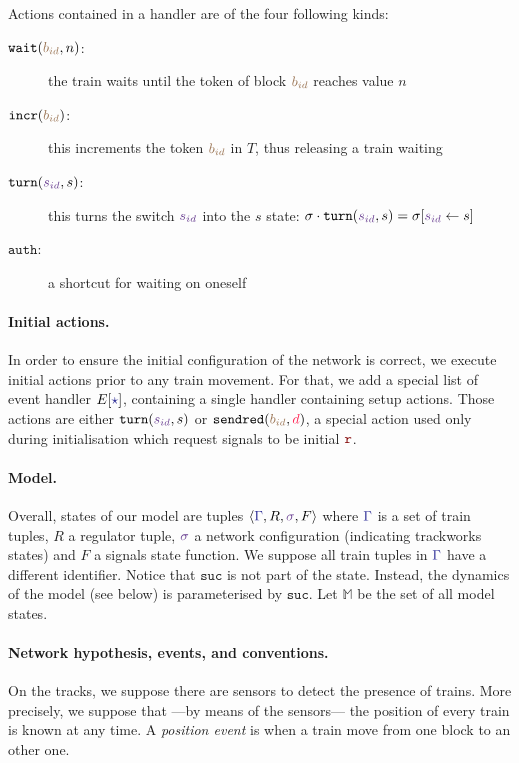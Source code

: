 \documentclass[runningheads]{llncs}
\newcommand{\tuple}[1]{\ensuremath{\langle #1\rangle}}
\newcommand{\sucblock}{{\mathtt{suc}}}
\newcommand{\modelSet}{\ensuremath{\mathbb{M}}}
\newcommand{\dirFmt}[1]{{\color{dircolor} #1}}
\newcommand{\posFmt}[1]{{\color{poscolor}{#1}}}
\newcommand{\bid}[1]{\ensuremath{\posFmt{b_{#1}}}}
\newcommand{\swFmt}[1]{{\color{swcolor}{#1}}}
\newcommand{\sid}[1]{\ensuremath{\swFmt{s_{#1}}}}
\newcommand{\switches}{\ensuremath{\swFmt{\sigma}}}
\newcommand{\trainFmt}[1]{{\color{traincolor} #1}}
\newcommand{\trainSeq}{\ensuremath{\trainFmt{\Gamma}}\xspace}
\newcommand{\handlerOf}[2]{\ensuremath{#1[\trainFmt{#2}]}}
\newcommand{\incr}[1]{{\mbox{\ensuremath{\mathtt{incr}(\posFmt{#1})}}}\xspace}
\newcommand{\turn}[2]{{\mbox{\ensuremath{\mathtt{turn}(#1, #2)}}}\xspace}
\newcommand{\auth}{{\mbox{\ensuremath{\mathtt{auth}}}}\xspace}
\newcommand{\regulator}{\ensuremath{R}}
\newcommand{\wait}[2]{{\mbox{\ensuremath{\mathtt{wait}(\posFmt{#1}, #2)}}}\xspace}
\newcommand{\initialHandler}[1]{\handlerOf{#1}{\star}}
\newcommand{\sendred}[2]{\ensuremath{{\tt sendred}(#1, #2)}}
\newcommand{\sigred}{{\mbox{${\color{red!50!black}\mathtt{r}}$}}\xspace}
\newcommand{\signals}{\ensuremath{F}}
\begin{document}
Actions contained in a handler are of the four following kinds:
\begin{description}
	\item [\wait{\bid{id}}{n}:] the train waits until the token of block \bid{id} reaches value $n$
	\item [\incr{\bid{id}}:] this increments the token $\bid{id}$ in $T$, thus releasing a train waiting
	\item [\turn{\sid{id}}{s}:] this turns the switch $\sid{id}$ into the $s$ state: $\sigma\cdot\turn{\sid{id}}{s} = \sigma[\sid{id} \leftarrow s]$
	\item [\auth:] a shortcut for waiting on oneself
\end{description}

\paragraph{Initial actions.}
In order to ensure the initial configuration of the network is correct, we execute initial actions prior to any train movement. For that, we add a special list of event handler \initialHandler{E}, containing a single handler containing setup actions. Those actions are either \turn{\sid{id}}{s} or \sendred{\bid{id}}{\dirFmt{d}}, a special action used only during initialisation which request signals to be initial \sigred.

\paragraph{Model.}
Overall, states of our model are tuples $\tuple{\trainSeq, \regulator, \switches, \signals}$ where $\trainSeq$ is a set of train tuples, $\regulator$ a regulator tuple, $\switches$ a network configuration (indicating trackworks states) and $\signals$ a signals state function. We suppose all train tuples in $\trainSeq$ have a different identifier. Notice that $\sucblock$ is not part of the state. Instead, the dynamics of the model (see below) is parameterised by $\sucblock$. Let $\modelSet$ be the set of all model states.

\paragraph{Network hypothesis, events, and conventions.}
On the tracks, we suppose there are sensors to detect the presence of trains. More precisely, we suppose that ---by means of the sensors--- the position of every train is known at any time. A \emph{position event} is when a train move from one block to an other one. 
\end{document}
